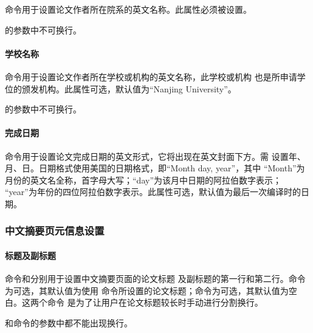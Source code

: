 命令用于设置论文作者所在院系的英文名称。此属性必须被设置。
\begin{tex}
\end{tex}
\begin{note}
的参数中不可换行。
\end{note}

\paragraph{学校名称}

命令用于设置论文作者所在学校或机构的英文名称，此学校或机构
也是所申请学位的颁发机构。此属性可选，默认值为``Nanjing University''。
\begin{tex}
\end{tex}
\begin{note}
的参数中不可换行。
\end{note}

\paragraph{完成日期}

命令用于设置论文完成日期的英文形式，它将出现在英文封面下方。需
设置年、月、日。日期格式使用美国的日期格式，即``Month day, year''，其中
``Month''为月份的英文名全称，首字母大写；``day''为该月中日期的阿拉伯数字表示；
``year''为年份的四位阿拉伯数字表示。此属性可选，默认值为最后一次编译时的日期。
\begin{tex}
\end{tex}

\subsubsection{中文摘要页元信息设置}

\paragraph{标题及副标题}

命令和分别用于设置中文摘要页面的论文标题
及副标题的第一行和第二行。命令为可选，其默认值为使用
命令所设置的论文标题；命令为可选，其默认值为空白。这两个命令
是为了让用户在论文标题较长时手动进行分割换行。
\begin{tex}
\end{tex}
\begin{note}
和命令的参数中都不能出现换行。
\end{note}

